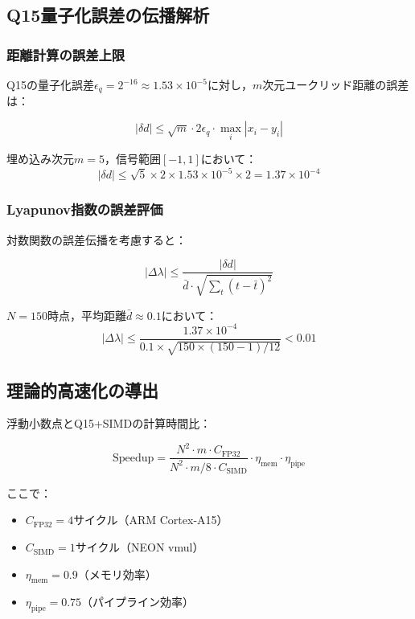\documentclass[paper]{ieice}
\begin{document}
\subsection{Q15量子化誤差の伝播解析}

\subsubsection{距離計算の誤差上限}
Q15の量子化誤差$\epsilon_q = 2^{-16} \approx 1.53 \times 10^{-5}$に対し，$m$次元ユークリッド距離の誤差は：

\begin{equation}
|\delta d| \leq \sqrt{m} \cdot 2\epsilon_q \cdot \max_i |x_i - y_i|
\end{equation}

埋め込み次元$m=5$，信号範囲$[-1,1]$において：
\begin{equation}
|\delta d| \leq \sqrt{5} \times 2 \times 1.53 \times 10^{-5} \times 2 = 1.37 \times 10^{-4}
\end{equation}

\subsubsection{Lyapunov指数の誤差評価}
対数関数の誤差伝播を考慮すると：

\begin{equation}
|\Delta\lambda| \leq \frac{|\delta d|}{\bar{d} \cdot \sqrt{\sum_{t}(t - \bar{t})^2}}
\end{equation}

$N=150$時点，平均距離$\bar{d} \approx 0.1$において：
\begin{equation}
|\Delta\lambda| \leq \frac{1.37 \times 10^{-4}}{0.1 \times \sqrt{150 \times (150-1)/12}} < 0.01
\end{equation}

\subsection{理論的高速化の導出}

浮動小数点とQ15+SIMDの計算時間比：

\begin{equation}
\text{Speedup} = \frac{N^2 \cdot m \cdot C_{\text{FP32}}}{N^2 \cdot m/8 \cdot C_{\text{SIMD}}} \cdot \eta_{\text{mem}} \cdot \eta_{\text{pipe}}
\end{equation}

ここで：
\begin{itemize}
\item $C_{\text{FP32}} = 4$サイクル（ARM Cortex-A15）
\item $C_{\text{SIMD}} = 1$サイクル（NEON vmul）
\item $\eta_{\text{mem}} = 0.9$（メモリ効率）
\item $\eta_{\text{pipe}} = 0.75$（パイプライン効率）
\end{itemize}
\end{document}
